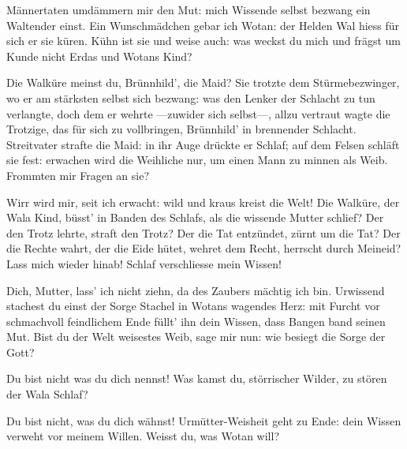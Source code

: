 \begin{drama}
\Erdaspeaks

Männertaten
umdämmern mir den Mut:
mich Wissende selbst
bezwang ein Waltender einst.
Ein Wunschmädchen
gebar ich Wotan:
der Helden Wal
hiess für sich er sie küren.
Kühn ist sie
und weise auch:
was weckst du mich
und frägst um Kunde
nicht Erdas und Wotans Kind?

\Wandererspeaks

Die Walküre meinst du,
Brünnhild', die Maid?
Sie trotzte dem Stürmebezwinger,
wo er am stärksten selbst sich bezwang:
was den Lenker der Schlacht
zu tun verlangte,
doch dem er wehrte
---zuwider sich selbst---,
allzu vertraut
wagte die Trotzige,
das für sich zu vollbringen,
Brünnhild' in brennender Schlacht.
Streitvater
strafte die Maid:
in ihr Auge drückte er Schlaf;
auf dem Felsen schläft sie fest:
erwachen wird
die Weihliche nur,
um einen Mann zu minnen als Weib.
Frommten mir Fragen an sie?

\Erdaspeaks


Wirr wird mir,
seit ich erwacht:
wild und kraus
kreist die Welt!
Die Walküre,
der Wala Kind,
büsst' in Banden des Schlafs,
als die wissende Mutter schlief?
Der den Trotz lehrte,
straft den Trotz?
Der die Tat entzündet,
zürnt um die Tat?
Der die Rechte wahrt,
der die Eide hütet,
wehret dem Recht,
herrscht durch Meineid?
Lass mich wieder hinab!
Schlaf verschliesse mein Wissen!

\Wandererspeaks

Dich, Mutter, lass' ich nicht ziehn,
da des Zaubers mächtig ich bin.
Urwissend
stachest du einst
der Sorge Stachel
in Wotans wagendes Herz:
mit Furcht vor schmachvoll
feindlichem Ende
füllt' ihn dein Wissen,
dass Bangen band seinen Mut.
Bist du der Welt
weisestes Weib,
sage mir nun:
wie besiegt die Sorge der Gott?

\Erdaspeaks

Du bist nicht
was du dich nennst!
Was kamst du, störrischer Wilder,
zu stören der Wala Schlaf?

\Wandererspeaks

Du bist nicht,
was du dich wähnst!
Urmütter-Weisheit
geht zu Ende:
dein Wissen verweht
vor meinem Willen.
Weisst du, was Wotan will?



\end{drama}
